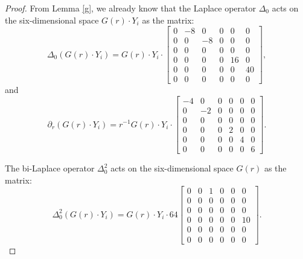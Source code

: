 \documentclass[11pt,letterpaper]{amsart}
\theoremstyle{definition}
\theoremstyle{remark}
\numberwithin{equation}{section}
\begin{document}
\begin{proof}
    From Lemma \ref{g}, we already know that 
    the Laplace operator $\Delta_0$ acts on the six-dimensional space $G(r)\cdot Y_i$ as the matrix:
\begin{equation}
    \Delta_0(G(r)\cdot Y_i)=G(r)\cdot Y_i\cdot 
    \begin{bmatrix}
0 & -8 & 0 & 0 & 0& 0\\
0 & 0 & -8 & 0 & 0& 0\\
0 & 0 & 0 & 0 & 0& 0\\
0 & 0 & 0 & 0 & 16& 0\\
0 & 0 & 0 & 0 & 0& 40\\
0 & 0 & 0 & 0 & 0& 0
\end{bmatrix},
\end{equation}
and
\begin{equation*}
        \partial_r \left(G(r)\cdot Y_i\right)=r^{-1}G(r)\cdot Y_i\cdot\begin{bmatrix}
-4 & 0 & 0 & 0 & 0& 0\\
0 & -2 & 0 & 0 & 0& 0\\
0 & 0 & 0 & 0 & 0& 0\\
0 & 0 & 0 & 2 & 0& 0\\
0 & 0 & 0 & 0 & 4& 0\\
0 & 0 & 0 & 0 & 0& 6
        \end{bmatrix}.
    \end{equation*}

The bi-Laplace operator $\Delta^2_0$ acts on the six-dimensional space $G(r)$ as the matrix:
\begin{equation}
    \Delta^2_0(G(r)\cdot Y_i)=G(r)\cdot Y_i\cdot 
    64 \begin{bmatrix}
0 & 0 & 1 & 0 & 0& 0\\
0 & 0 & 0 & 0 & 0& 0\\
0 & 0 & 0 & 0 & 0& 0\\
0 & 0 & 0 & 0 & 0& 10\\
0 & 0 & 0 & 0 & 0& 0\\
0 & 0 & 0 & 0 & 0& 0
\end{bmatrix}.
\end{equation}


\end{proof}
\end{document}
